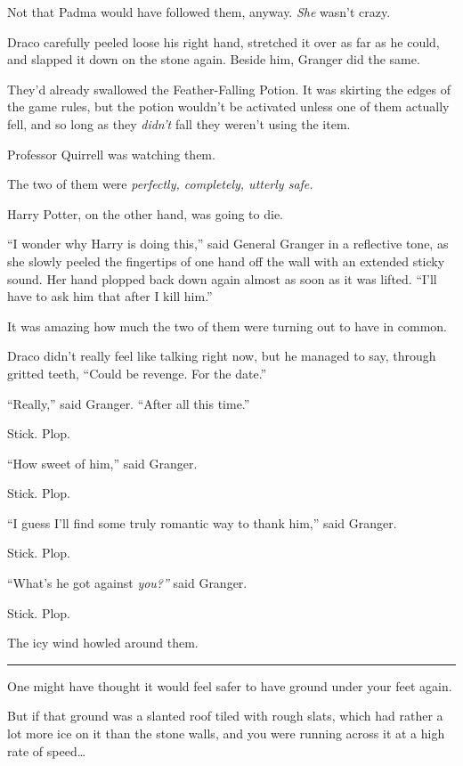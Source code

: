 Not that Padma would have followed them, anyway. \emph{She} wasn't
crazy.

Draco carefully peeled loose his right hand, stretched it over as far as
he could, and slapped it down on the stone again. Beside him, Granger
did the same.

They'd already swallowed the Feather-Falling Potion. It was skirting the
edges of the game rules, but the potion wouldn't be activated unless one
of them actually fell, and so long as they \emph{didn't} fall they
weren't using the item.

Professor Quirrell was watching them.

The two of them were \emph{perfectly, completely, utterly safe.}

Harry Potter, on the other hand, was going to die.

``I wonder why Harry is doing this,'' said General Granger in a
reflective tone, as she slowly peeled the fingertips of one hand off the
wall with an extended sticky sound. Her hand plopped back down again
almost as soon as it was lifted. ``I'll have to ask him that after I
kill him.''

It was amazing how much the two of them were turning out to have in
common.

Draco didn't really feel like talking right now, but he managed to say,
through gritted teeth, ``Could be revenge. For the date.''

``Really,'' said Granger. ``After all this time.''

Stick. Plop.

``How sweet of him,'' said Granger.

Stick. Plop.

``I guess I'll find some truly romantic way to thank him,'' said
Granger.

Stick. Plop.

``What's he got against \emph{you?''} said Granger.

Stick. Plop.

The icy wind howled around them.

\begin{center}\rule{3in}{0.4pt}\end{center}

One might have thought it would feel safer to have ground under your
feet again.

But if that ground was a slanted roof tiled with rough slats, which had
rather a lot more ice on it than the stone walls, and you were running
across it at a high rate of speed\ldots{}

